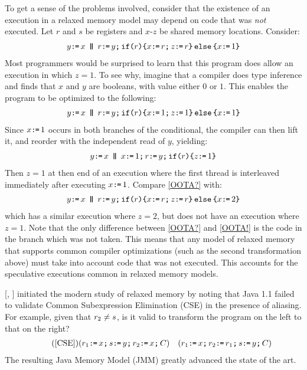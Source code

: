 To get a sense of the problems involved,
consider that the existence of an execution in a relaxed memory model may
depend on code that was \emph{not} executed. Let $r$ and $s$ be registers and
$x$-$z$ be shared memory locations.  Consider:
\begin{gather}
  \label{OOTA?}
    y\GETS x
  \PAR
  r\GETS y\SEMI\IF{r}\THEN 
  x\GETS r\SEMI z\GETS r \ELSE x\GETS1 \FI
\end{gather}
Most programmers would be surprised to learn that this program does allow an
execution in which $z=1$. To see why, imagine that a compiler does type
inference and finds that $x$ and $y$ are booleans, with value either $0$ or
$1$.  This enables the program to be optimized to the following:
\begin{gather*}
    y\GETS x
  \PAR
  r\GETS y\SEMI\IF{r}\THEN 
  x\GETS 1\SEMI z\GETS 1 \ELSE x\GETS1 \FI
\end{gather*}
Since $x\texttt{:}\mkern-1mu\texttt{=}\,1$ occurs in both branches of the conditional, the compiler can
then lift it, and reorder with the independent read of $y$, yielding:
\begin{gather*}
    y\GETS x
  \PAR
  x\GETS1\SEMI
  r\GETS y\SEMI\IF{r}\THEN z\GETS 1 \FI
\end{gather*}
Then $z=1$ at then end of an execution where the first thread is interleaved
immediately after executing $x\texttt{:}\mkern-1mu\texttt{=}\,1$.  Compare \eqref{OOTA?} with:
\begin{gather}
  \label{OOTA!}
    y\GETS x
  \PAR
  r\GETS y\SEMI \IF{r}\THEN 
  x\GETS r\SEMI z\GETS r \ELSE x\GETS2 \FI
\end{gather}
which has a similar execution where $z=2$, but does not have an execution
where $z=1$. Note that the only difference between \eqref{OOTA?} and
\eqref{OOTA!} is the code in the branch which was not taken. This means that
any model of relaxed memory that supports common compiler optimizations (such
as the second transformation above) must take into account code that was not
executed. This accounts for the speculative executions common in relaxed
memory models.



\citeauthor{DBLP:conf/java/Pugh99} [\citeyear{DBLP:conf/java/Pugh99},
] initiated the modern study of relaxed memory by noting that
Java 1.1 failed to validate Common Subexpression Elimination (CSE) in the
presence of aliasing. For example, given that $r_2\neq s$, is it valid
to transform the program on the left to that on the right?
\begin{align*}
  \tag{\ref{CSE}}
  ({r_1\GETS \aLoc \SEMI
  s\GETS \bLoc \SEMI  
  r_2\GETS \aLoc\SEMI\aCmd})
&&
  ({r_1\GETS \aLoc \SEMI     
    r_2\GETS r_1\SEMI
    s\GETS \bLoc \SEMI\aCmd})
\end{align*}
The resulting Java Memory Model (JMM) \cite{Manson:2005:JMM:1047659.1040336}
greatly advanced the state of the art.


